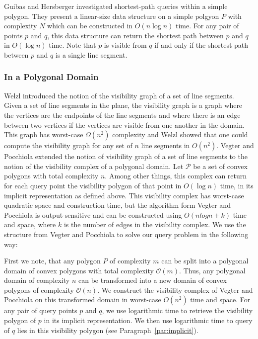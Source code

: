 \documentclass{article}
\begin{document}
Guibas and Hersberger \cite{GUIBAS1989126} investigated shortest-path queries within a simple polygon. They present a linear-size data structure on a simple polgyon $P$ with complexity $N$ which can be constructed in $O(n \log n)$ time. For any pair of points $p$ and $q$, this data structure can return the shortest path between $p$ and $q$ in $O(\log n)$ time. Note that $p$ is visible from $q$ if and only if the shortest path between $p$ and $q$ is a single line segment.

\subsubsection{In a Polygonal Domain}


Welzl \cite{welzl1985constructing} introduced the notion of the visibility graph of a set of line segments. Given a set of line segments in the plane, the visibility graph is a graph where the vertices are the endpoints of the line segments and where there is an edge between two vertices if the vertices are visible from one another in the domain. This graph has worst-case $\Omega(n^2)$ complexity and Welzl showed that one could compute the visibility graph for any set of $n$ line segments in $O(n^2)$. Vegter and Pocchiola \cite{POCCHIOLA1996279} extended the notion of visibility graph of a set of line segments to the notion of the visibility complex of a polygonal domain. Let $\mathcal{P}$ be a set of convex polygons with total complexity $n$. Among other things, this complex can return for each query point the visibility polygon of that point in $O(\log n)$ time, in its implicit representation as defined above. This visibility complex has worst-case quadratic space and construction time, but the algorithm form Vegter and Pocchiola is output-sensitive and can be constructed using $O(n log n + k)$ time and space, where $k$ is the number of edges in the visibility complex. We use the structure from Vegter and Pocchiola to solve our query problem in the following way:

First we note, that any polygon $P$ of complexity $m$ can be split into a polygonal domain of convex polygons with total complexity $\mathcal{O}(m)$. Thus, any polygonal domain of complexity $n$ can be transformed into a new domain of convex polygons of complexity $\mathcal{O}(n)$. We construct the visibility complex of Vegter and Pocchiola on this transformed domain in worst-case $O(n^2)$ time and space. For any pair of query points $p$ and $q$, we use logarithmic time to retrieve the visibility polygon of $p$ in its implicit representation. We then use logarithmic time to query of $q$ lies in this visibility polygon (see Paragraph~\ref{par:implicit}).
\end{document}
